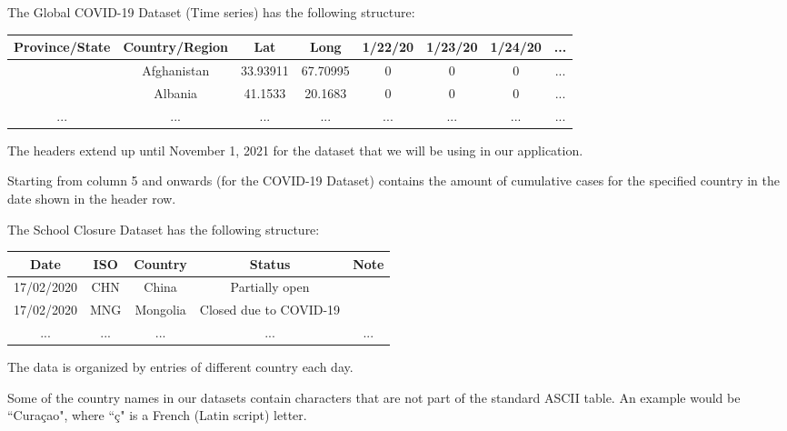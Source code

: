 \documentclass[fontsize=11pt]{article}
\begin{document}
    The Global COVID-19 Dataset (Time series) has the following structure:

    \begin{center}
        \begin{tabular}{ |c|c|c|c|c|c|c|c| }
            \hline
            Province/State & Country/Region & Lat      & Long     & 1/22/20 & 1/23/20 & 1/24/20 & ... \\
            \hline
            & Afghanistan    & 33.93911 & 67.70995 & 0       & 0       & 0       & ... \\
            \hline
            & Albania        & 41.1533  & 20.1683  & 0       & 0       & 0       & ... \\
            \hline
            ...            & ...            & ...      & ...      & ...     & ...     & ...     & ... \\
            \hline
        \end{tabular}
    \end{center}

    The headers extend up until November 1, 2021 for the dataset that we will be using in our application.

    Starting from column 5 and onwards (for the COVID-19 Dataset) contains the amount of cumulative cases for the specified country in the date shown in the header row.

    The School Closure Dataset has the following structure:
    \begin{center}
        \begin{tabular}{ |c|c|c|c|c| }
            \hline
            Date       & ISO & Country  & Status                  & Note\\
            \hline
            17/02/2020 & CHN & China    & Partially open          & \\
            \hline
            17/02/2020 & MNG & Mongolia & Closed due to COVID-19  & \\
            \hline
            ...        & ... & ...      & ...                     & ...\\
            \hline
        \end{tabular}
    \end{center}

    The data is organized by entries of different country each day.

    Some of the country names in our datasets contain characters that are not part of the standard ASCII table. An example would be ``Cura\c{c}ao", where ``\c{c}" is a French (Latin script) letter.
\end{document}
